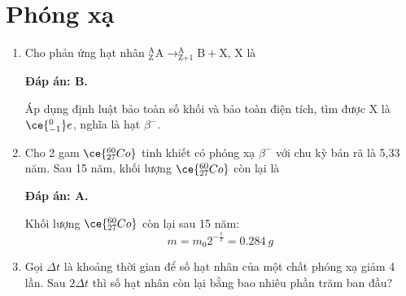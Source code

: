 \section{Phóng xạ}
\begin{enumerate}[label=\bfseries Câu \arabic*:]
	\item {}	
	\cauhoi
	{Cho phản ứng hạt nhân $^{\text{A}}_{\text{Z}} \text{A} \longrightarrow ^{\text{A}}_{\text{Z+1}} \text{B} + \text{X}$, X là
	}
	
	\loigiai
	{		\textbf{Đáp án: B.}
		
		Áp dụng định luật bảo toàn số khối và bảo toàn điện tích, tìm được X là $\ce{^0_{-1}} e$, nghĩa là hạt $\beta^-$.
		
	}
		\item {}
	\cauhoi
	{Cho 2 gam $\ce{^{60}_{27} Co}$ tinh khiết có phóng xạ $\beta^{-}$ với chu kỳ bán rã là 5,33 năm. Sau 15 năm, khối lượng $\ce{^{60}_{27} Co}$ còn lại là
	}
	
	\loigiai
	{		\textbf{Đáp án: A.}
		
		Khối lượng $\ce{^{60}_{27} Co}$ còn lại sau 15 năm:
		$$m=m_0 2^{-\frac{t}{T}} = \SI{0.284}{g}$$
		
	}
	
	\item {}
	\cauhoi
	{Gọi $\Delta t$ là khoảng thời gian để số hạt nhân của một chất phóng xạ giảm 4 lần. Sau $2\Delta t$  thì số hạt nhân còn lại bằng bao nhiêu phần trăm ban đầu?
	}
	

\end{enumerate}

